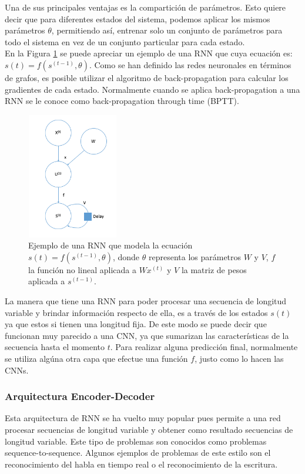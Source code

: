 Una de sus principales ventajas es la compartición de parámetros. Esto quiere decir que para diferentes estados del sistema, podemos aplicar los mismos parámetros $\theta$, permitiendo así, entrenar solo un conjunto de parámetros para todo el sistema en vez de un conjunto particular para cada estado. \\

En la Figura \ref{fig:rnn} se puede apreciar un ejemplo de una RNN que cuya ecuación es: $s(t) = f(s^{(t-1)}, \theta)$. Como se han definido las redes neuronales en términos de grafos, es posible utilizar el algoritmo de back-propagation para calcular los gradientes de cada estado. Normalmente cuando se aplica back-propagation a una RNN se le conoce como back-propagation through time (BPTT). \\

\begin{figure}[H]
	\centering
	\includegraphics[width=4cm, height=5.5cm]{capitulo2/images/rnn}
	\caption{Ejemplo de una RNN que modela la ecuación $s(t) = f(s^{(t-1)}, \theta)$, donde $\theta$ representa los parámetros $W$ y $V$, $f$ la función no lineal aplicada a $Wx^{(t)}$ y $V$ la matriz de pesos aplicada a $s^{(t-1)}$.}
	\label{fig:rnn}
\end{figure}

La manera que tiene una RNN para poder procesar una secuencia de longitud variable y brindar información respecto de ella, es a través de los estados $s(t)$ ya que estos si tienen una longitud fija. De este modo se puede decir que funcionan muy parecido a una CNN, ya que sumarizan las características de la secuencia hasta el momento $t$. Para realizar alguna predicción final, normalmente se utiliza algúna otra capa que efectue una función $f$, justo como lo hacen las CNNs. \\
  
    \subsubsection{Arquitectura Encoder-Decoder}
    Esta arquitectura de RNN se ha vuelto muy popular pues permite a una red procesar secuencias de longitud variable y obtener como resultado secuencias de longitud variable. Este tipo de problemas son conocidos como problemas sequence-to-sequence. Algunos ejemplos de problemas de este estilo son el reconocimiento del habla en tiempo real o el reconocimiento de la escritura. \\
    
